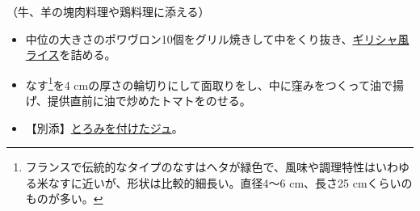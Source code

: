 \begin{recette}


（牛、羊の塊肉料理や鶏料理に添える）

\begin{itemize}
\item
  中位の大きさのポワヴロン10個をグリル焼きして中をくり抜き、\protect\hyperlink{riz-grecque}{ギリシャ風ライス}を詰める。
\item
  なす\footnote{フランスで伝統的なタイプのなすはヘタが緑色で、風味や調理特性はいわゆる米なすに近いが、形状は比較的細長い。直径4〜6
    cm、長さ25 cmくらいのものが多い。}を4
  cmの厚さの輪切りにして面取りをし、中に窪みをつくって油で揚げ、提供直前に油で炒めたトマトをのせる。
\item
  【別添】\protect\hyperlink{jus-de-veau-lie}{とろみを付けたジュ}。
\end{itemize}

\atoaki{}

\hypertarget{garniture-arlesienne}{%
}
\end{recette}
